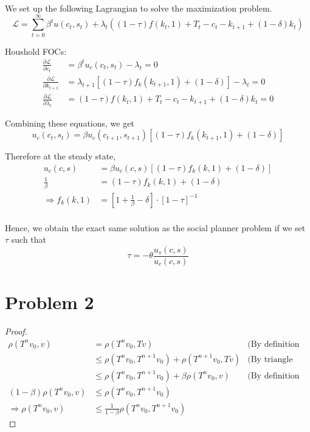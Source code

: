\documentclass[12pt]{article}
\theoremstyle{definition}
\begin{document}
We set up the following Lagrangian to solve the maximization problem.
\[
\mathcal{L} = \sum_{t=0}^{\infty}\beta^t u(c_t,s_t) + \lambda_t \left(  (1-\tau)f(k_t,1)+T_t- c_t-k_{t+1}+(1-\delta)k_t \right) 
\]

Houshold FOCs:
\begin{align*}
\frac{\partial \mathcal{L}}{\partial c_t}& = \beta^tu_c(c_t,s_t) -\lambda_t = 0 \\
\frac{\partial \mathcal{L}}{\partial k_{t+1}} &= \lambda_{t+1} \left[ (1-\tau)f_k(k_{t+1},1) + (1-\delta)\right] - \lambda_t = 0\\
\frac{\partial \mathcal{L}}{\partial \lambda_t} &= (1-\tau)f(k_t,1)+T_t- c_t-k_{t+1}+(1-\delta)k_t = 0
\end{align*}

Combining these equations, we get
\[
u_c(c_t,s_t)=\beta u_c(c_{t+1},s_{t+1})\left[(1-\tau)f_k(k_{t+1},1) + (1-\delta) \right]  
\]

Therefore at the steady state,
\begin{align*}
u_c(c,s) & =\beta u_c(c,s)\left[(1-\tau)f_k(k,1) + (1-\delta) \right]   \\
\frac{1}{\beta} &= (1-\tau)f_k(k,1) + (1-\delta)\\
\Rightarrow f_k(k,1) &= \left[ 1 + \frac{1}{\beta} -\delta\right] 
\cdot \left[ 1-\tau \right]^{-1}\\
\end{align*}

Hence, we obtain the exact same solution as the social planner problem if we set $\tau$ such that 
\[
\tau = -\theta\frac{u_s(c,s)}{u_c(c,s)}
\]

\section*{Problem 2}

\begin{proof}
\begin{align*}
	\rho(T^nv_0,v) & =  \rho(T^{n}v_0,Tv)  & \text{(By definition of fixed point)} \\
	 & \leq \rho(T^{n}v_0,T^{n+1}v_0) +  \rho(T^{n+1}v_0,Tv)   & \text{(By triangle inequality)} \\
	 & \leq \rho(T^{n}v_0,T^{n+1}v_0) +  \beta \rho(T^{n}v_0,v) & \text{(By definition of contraction mapping)}\\
	 (1-\beta )\rho(T^nv_0,v)& \leq \rho(T^{n} v_0,T^{n+1}v_0)   \\
	\Rightarrow \rho(T^nv_0,v)& \leq \frac{1}{1-\beta} \rho(T^n v_0,T^{n+1}v_0)
\end{align*}

\end{proof}
\end{document}
